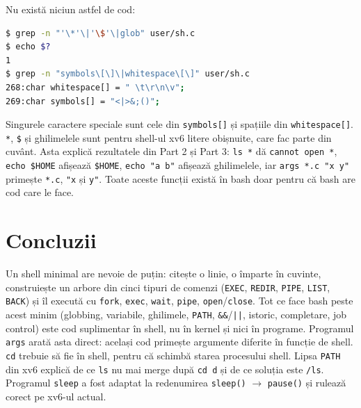 \documentclass[12pt,a4paper]{article}
\begin{document}
\begin{enumerate}
Nu există niciun astfel de cod:
\begin{lstlisting}[language=bash]
$ grep -n "'\*'\|'\$'\|glob" user/sh.c
$ echo $?
1
$ grep -n "symbols\[\]\|whitespace\[\]" user/sh.c
268:char whitespace[] = " \t\r\n\v";
269:char symbols[] = "<|>&;()";
\end{lstlisting}
Singurele caractere speciale sunt cele din \texttt{symbols[]} și spațiile din \texttt{whitespace[]}. \texttt{*}, \texttt{\$} și ghilimelele sunt pentru shell-ul xv6 litere obișnuite, care fac parte din cuvânt. Asta explică rezultatele din Part 2 și Part 3: \texttt{ls *} dă \texttt{cannot open *}, \texttt{echo \$HOME} afișează \texttt{\$HOME}, \texttt{echo "a b"} afișează ghilimelele, iar \texttt{args *.c "x y"} primește \texttt{*.c}, \texttt{"x} și \texttt{y"}. Toate aceste funcții există în bash doar pentru că bash are cod care le face.
\end{enumerate}

\section*{Concluzii}
Un shell minimal are nevoie de puțin: citește o linie, o împarte în cuvinte, construiește un arbore din cinci tipuri de comenzi (\texttt{EXEC}, \texttt{REDIR}, \texttt{PIPE}, \texttt{LIST}, \texttt{BACK}) și îl execută cu \texttt{fork}, \texttt{exec}, \texttt{wait}, \texttt{pipe}, \texttt{open}/\texttt{close}. Tot ce face bash peste acest minim (globbing, variabile, ghilimele, \texttt{PATH}, \texttt{\&\&}/\texttt{||}, istoric, completare, job control) este cod suplimentar în shell, nu în kernel și nici în programe. Programul \texttt{args} arată asta direct: același cod primește argumente diferite în funcție de shell. \texttt{cd} trebuie să fie în shell, pentru că schimbă starea procesului shell. Lipsa \texttt{PATH} din xv6 explică de ce \texttt{ls} nu mai merge după \texttt{cd d} și de ce soluția este \texttt{/ls}. Programul \texttt{sleep} a fost adaptat la redenumirea \texttt{sleep()} $\rightarrow$ \texttt{pause()} și rulează corect pe xv6-ul actual.
\end{document}
